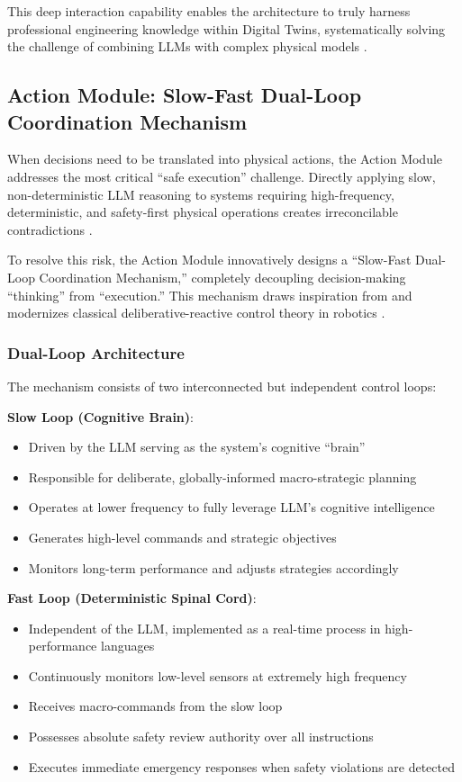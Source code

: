 This deep interaction capability enables the architecture to truly harness professional engineering knowledge within Digital Twins, systematically solving the challenge of combining LLMs with complex physical models \cite{lu2022unified}.

\subsection{Action Module: Slow-Fast Dual-Loop Coordination Mechanism}

When decisions need to be translated into physical actions, the Action Module addresses the most critical ``safe execution'' challenge. Directly applying slow, non-deterministic LLM reasoning to systems requiring high-frequency, deterministic, and safety-first physical operations creates irreconcilable contradictions \cite{amodei2016concrete}.

To resolve this risk, the Action Module innovatively designs a ``Slow-Fast Dual-Loop Coordination Mechanism,'' completely decoupling decision-making ``thinking'' from ``execution.'' This mechanism draws inspiration from and modernizes classical deliberative-reactive control theory in robotics \cite{gat1998three}.

\subsubsection{Dual-Loop Architecture}

The mechanism consists of two interconnected but independent control loops:

\textbf{Slow Loop (Cognitive Brain)}: 
\begin{itemize}
\item Driven by the LLM serving as the system's cognitive ``brain''
\item Responsible for deliberate, globally-informed macro-strategic planning
\item Operates at lower frequency to fully leverage LLM's cognitive intelligence
\item Generates high-level commands and strategic objectives
\item Monitors long-term performance and adjusts strategies accordingly
\end{itemize}

\textbf{Fast Loop (Deterministic Spinal Cord)}:
\begin{itemize}
\item Independent of the LLM, implemented as a real-time process in high-performance languages
\item Continuously monitors low-level sensors at extremely high frequency
\item Receives macro-commands from the slow loop
\item Possesses absolute safety review authority over all instructions
\item Executes immediate emergency responses when safety violations are detected
\end{itemize}

